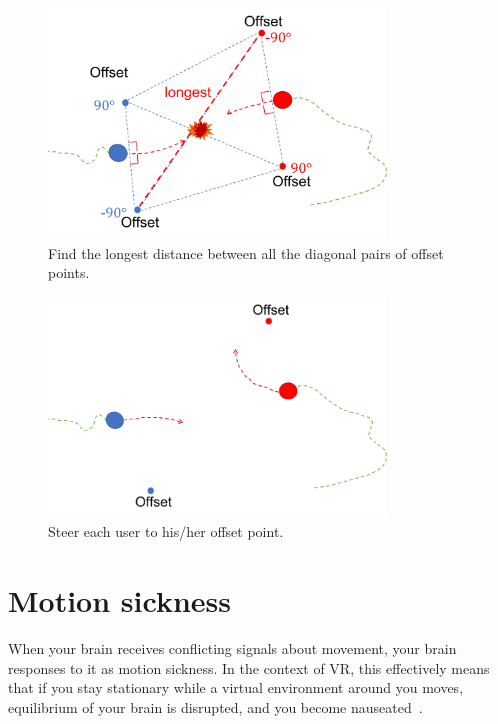 \begin{figure}[H]\centering
	\includegraphics[width=0.8\textwidth]{Pictures/Find the longest distance.png}%
	\caption{Find the longest distance between all the diagonal pairs of offset points.}\label{fig:S2OC_FindLongDis}%
\end{figure}
\begin{figure}[H]\centering
	\includegraphics[width=0.8\textwidth]{Pictures/Steer each user to offset point.png}%
	\caption{Steer each user to his/her offset point.}\label{fig:S2OC_Steer2Offset}%
\end{figure}


\newpage
\section{Motion sickness}
When your brain receives conflicting signals about movement, your brain responses to it as motion sickness. In the context of VR, this effectively means that if you stay stationary while a virtual environment around you moves, equilibrium of your brain is disrupted, and you become nauseated~\cite{5298757}.




